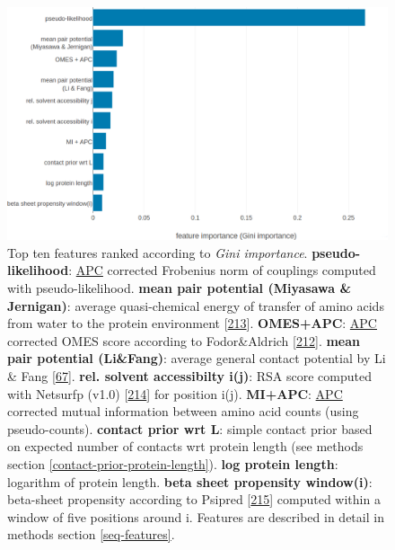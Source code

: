\documentclass[11pt,a4paper,twoside]{book}
\theoremstyle{definition}
\theoremstyle{definition}
\theoremstyle{remark}
\begin{document}
\begin{figure}

{\centering \includegraphics[width=1\linewidth]{img/random_forest_contact_prior/additional_contat_score_features/feature_random_forest_top_pLLfeature} 

}

\caption{Top ten features
ranked according to \emph{Gini importance}. \textbf{pseudo-likelihood}:
\protect\hyperlink{abbrev}{APC} corrected Frobenius norm of couplings
computed with pseudo-likelihood. \textbf{mean pair potential (Miyasawa
\& Jernigan)}: average quasi-chemical energy of transfer of amino acids
from water to the protein environment
{[}\protect\hyperlink{ref-Miyazawa1999a}{213}{]}. \textbf{OMES+APC}:
\protect\hyperlink{abbrev}{APC} corrected OMES score according to
Fodor\&Aldrich {[}\protect\hyperlink{ref-Fodor2004a}{212}{]}.
\textbf{mean pair potential (Li\&Fang)}: average general contact
potential by Li \& Fang {[}\protect\hyperlink{ref-Li2011}{67}{]}.
\textbf{rel. solvent accessibilty i(j)}: RSA score computed with
Netsurfp (v1.0) {[}\protect\hyperlink{ref-Petersen2009a}{214}{]} for
position i(j). \textbf{MI+APC}: \protect\hyperlink{abbrev}{APC}
corrected mutual information between amino acid counts (using
pseudo-counts). \textbf{contact prior wrt L}: simple contact prior based
on expected number of contacts wrt protein length (see methods section
\ref{contact-prior-protein-length}). \textbf{log protein length}:
logarithm of protein length. \textbf{beta sheet propensity window(i)}:
beta-sheet propensity according to Psipred
{[}\protect\hyperlink{ref-Jones1999}{215}{]} computed within a window of
five positions around i. Features are described in detail in methods
section \ref{seq-features}.}\label{fig:feature-importance-rf-with-pll-score}
\end{figure}
\end{document}
